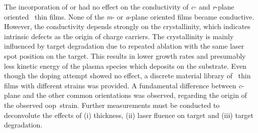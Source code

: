 The incorporation of  or  had no effect on the conductivity of \textit{c}- and \textit{r}-plane oriented \cro\ thin films.
None of the \textit{m}- or \textit{a}-plane oriented films became conductive.
However, the conductivity depends strongly on the crystallinity, which indicates intrinsic defects as the origin of charge carriers.
The crystallinity is mainly influenced by target degradation due to repeated ablation with the same laser spot position on the target.
This results in lower growth rates and presumably less kinetic energy of the plasma species which deposits on the substrate.
Even though the doping attempt showed no effect, a discrete material library of \cro\ thin films with different strains was provided.
A fundamental difference between \textit{c}-plane and the other common orientations was observed, regarding the origin of the observed \gls{oop}\ strain.
Further measurements must be conducted to deconvolute the effects of (i) thickness, (ii) laser fluence on target and (iii) target degradation.